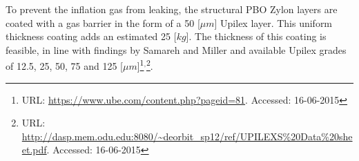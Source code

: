 To prevent the inflation gas from leaking, the structural PBO Zylon layers are coated with a gas barrier in the form of a 50 [$\mu m$] Upilex layer. This uniform thickness coating adds an estimated 25 [$kg$]. The thickness of this coating is feasible, in line with findings by Samareh and Miller \cite{Samareh2011,Miller2014} and available Upilex grades of 12.5, 25, 50, 75 and 125 [$\mu m$]\footnote{URL: \url{https://www.ube.com/content.php?pageid=81}. Accessed: 16-06-2015}$^{,}$\footnote{URL: \url{http://dasp.mem.odu.edu:8080/~deorbit_sp12/ref/UPILEXS\%20Data\%20sheet.pdf}. Accessed: 16-06-2015}.



